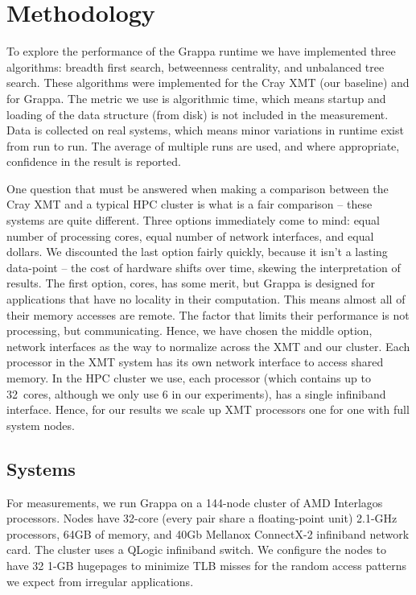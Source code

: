 \section{Methodology} \label{sec:method}

To explore the performance of the Grappa runtime we have implemented
three algorithms: breadth first search, betweenness centrality, and
unbalanced tree search.  These algorithms were implemented for the
Cray XMT (our baseline) and for Grappa.  The metric we use is
algorithmic time, which means startup and loading of the data
structure (from disk) is not included in the measurement.  Data is
collected on real systems, which means minor variations in runtime
exist from run to run.  The average of multiple runs are used, and
where appropriate, confidence in the result is reported.

One question that must be answered when making a comparison between the
Cray XMT and a typical HPC cluster is what is a fair comparison -- these
systems are quite different.  Three options immediately come to mind:
equal number of processing cores, equal number of network interfaces,
and equal dollars.  We discounted the last option fairly quickly,
because it isn't a lasting data-point -- the cost of hardware shifts
over time, skewing the interpretation of results.  The first option,
cores, has some merit, but Grappa is designed for applications that have
no locality in their computation.  This means almost all of their memory
accesses are remote.  The factor that limits their performance is not
processing, but communicating.  Hence, we have chosen the middle option,
network interfaces as the way to normalize across the XMT and our
cluster.  Each processor in the XMT system has its own network interface
to access shared memory.  In the HPC cluster we use, each processor
(which contains up to 32~cores, although we only use 6 in our
experiments), has a single infiniband interface.  Hence, for our results
we scale up XMT processors one for one with full system nodes.


\subsection{Systems}

For measurements, we run Grappa on a 144-node cluster of AMD Interlagos
processors. Nodes have 32-core (every pair share a floating-point unit)
2.1-GHz processors, 64GB of memory, and 40Gb Mellanox ConnectX-2
infiniband network card.   The cluster uses a QLogic infiniband switch.
We configure the nodes to have 32 1-GB hugepages to minimize TLB misses
for the random access patterns we expect from irregular applications.

